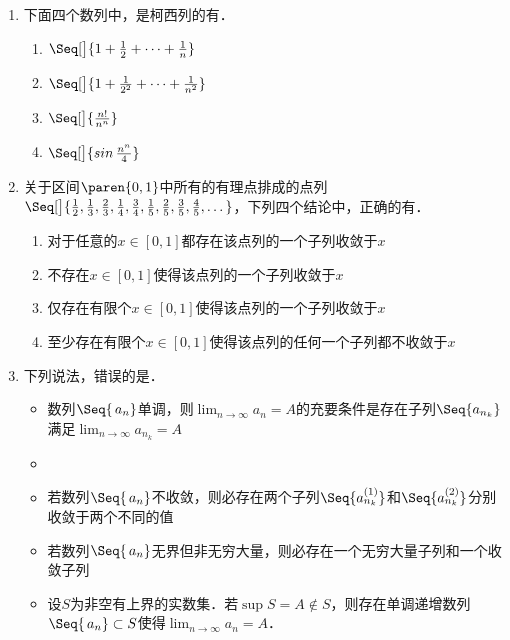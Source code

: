 \begin{enumerate}
\item 下面四个数列中，是柯西列的有\uline{}．
  \begin{enumerate}
    \renewcommand{\labelenumii}{\enumparen{\arabic{enumii}}}
  \item \(\Seq[\big]{1 + \frac12 + \dots + \frac1n}\)
  \item \(\Seq[\big]{1 + \frac1{2^2} + \dots + \frac1{n^2}}\)
  \item \(\Seq[\big]{\frac{n!}{n^n}}\)
  \item \(\Seq[\big]{\sin\frac{n^n}{4}}\)
  \end{enumerate}

\item 关于区间\(\paren{0,1}\)中所有的有理点排成的点列\(\Seq[\big]{\frac12, \frac13, \frac23, \frac14, \frac34, \frac15, \frac25, \frac35, \frac45, \dots}\)，下列四个结论中，正确的有\uline{}．
  \begin{enumerate}
    \renewcommand{\labelenumii}{\enumparen{\arabic{enumii}}}
  \item 对于任意的\(x \in [0,1]\)都存在该点列的一个子列收敛于\(x\)
  \item 不存在\(x \in [0,1]\)使得该点列的一个子列收敛于\(x\)
  \item 仅存在有限个\(x \in [0,1]\)使得该点列的一个子列收敛于\(x\)
  \item 至少存在有限个\(x \in [0,1]\)使得该点列的任何一个子列都不收敛于\(x\)
  \end{enumerate}

\item 下列说法，错误的是\uline{\makebox[6em]{}}．
  \begin{itemize}
    \renewcommand{\labelitemi}{\faCircleThin}
  \item 数列\(\Seq{\,a_n}\)单调，则\(\lim_{n\to\infty} a_n = A\)的充要条件是存在子列\(\Seq{a_{n_k}}\)满足\(\lim_{n\to\infty} a_{n_k} = A\)
    \ifshowsol
    \item[\faCircle]
    \else
    \item
    \fi
    若数列\(\Seq{\,a_n}\)不收敛，则必存在两个子列\(\Seq{a_{n_k}^{(1)}}\)和\(\Seq{a_{n_k}^{(2)}}\)分别收敛于两个不同的值
  \item 若数列\(\Seq{\,a_n}\)无界但非无穷大量，则必存在一个无穷大量子列和一个收敛子列
  \item 设\(S\)为非空有上界的实数集．若\(\sup S = A \notin S\)，则存在单调递增数列\(\Seq{\,a_n} \subset S\)使得\(\lim_{n\to\infty} a_n = A\)．
  \end{itemize}
\end{enumerate}
\fi

